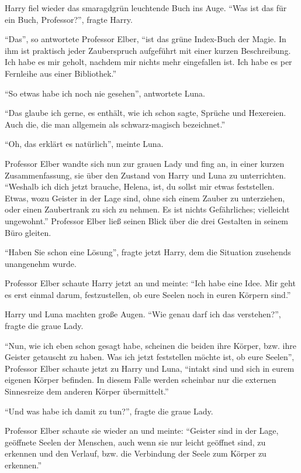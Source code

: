 Harry fiel wieder das smaragdgrün leuchtende Buch ins Auge. \enquote{Was ist das für ein Buch, Professor?}, fragte Harry.

\enquote{Das}, so antwortete Professor Elber, \enquote{ist das grüne Index-Buch der Magie. In ihm ist praktisch jeder Zauberspruch aufgeführt mit einer kurzen Beschreibung. Ich habe es mir geholt, nachdem mir nichts mehr eingefallen ist. Ich habe es per Fernleihe aus einer Bibliothek.}

\enquote{So etwas habe ich noch nie gesehen}, antwortete Luna.

\enquote{Das glaube ich gerne, es enthält, wie ich schon sagte,  Sprüche und Hexereien. Auch die, die man allgemein als schwarz-magisch bezeichnet.}

\enquote{Oh, das erklärt es natürlich}, meinte Luna.

Professor Elber wandte sich nun zur grauen Lady und fing an, in einer kurzen Zusammenfassung, sie über den Zustand von Harry und Luna zu unterrichten. \enquote{Weshalb ich dich jetzt brauche, Helena, ist, du sollst mir etwas feststellen. Etwas, wozu Geister in der Lage sind, ohne sich einem Zauber zu unterziehen, oder einen Zaubertrank zu sich zu nehmen. Es ist nichts Gefährliches; vielleicht ungewohnt.} Professor Elber ließ seinen Blick über die drei Gestalten in seinem Büro gleiten.

\enquote{Haben Sie schon eine Lösung}, fragte jetzt Harry, dem die Situation zusehends unangenehm wurde.

Professor Elber schaute Harry jetzt an und meinte: \enquote{Ich habe eine Idee. Mir geht es erst einmal darum, festzustellen, ob eure Seelen noch in euren Körpern sind.}

Harry und Luna machten große Augen. \enquote{Wie genau darf ich das verstehen?}, fragte die graue Lady.

\enquote{Nun, wie ich eben schon gesagt habe, scheinen die beiden ihre Körper, bzw. ihre Geister getauscht zu haben. Was ich jetzt feststellen möchte ist, ob eure Seelen}, Professor Elber schaute jetzt zu Harry und Luna, \enquote{intakt sind und sich in eurem eigenen Körper befinden. In diesem Falle werden scheinbar nur die externen Sinnesreize dem anderen Körper übermittelt.}

\enquote{Und was habe ich damit zu tun?}, fragte die graue Lady.

Professor Elber schaute sie wieder an und meinte: \enquote{Geister sind in der Lage, geöffnete Seelen der Menschen, auch wenn sie nur leicht geöffnet sind, zu erkennen und den Verlauf, bzw. die Verbindung der Seele zum Körper zu erkennen.}

